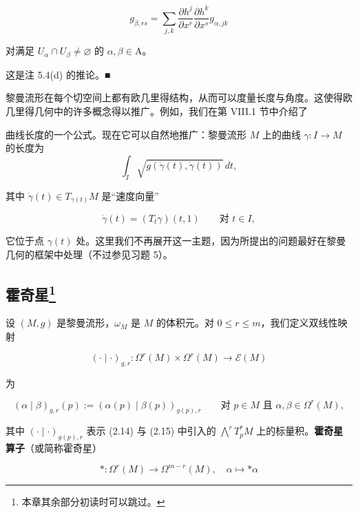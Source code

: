 \begin{example}
\[
g_{\beta,rs} = \sum_{j,k} \frac{\partial h^j}{\partial x^r} \frac{\partial h^k}{\partial x^s} g_{\alpha,jk}
\]

对满足 $ U_\alpha \cap U_\beta \ne \varnothing $ 的 $ \alpha, \beta \in \mathrm{A} $。

\proofhead
这是注 5.4(d) 的推论。\nobreak\hspace{0.35em}■

黎曼流形在每个切空间上都有欧几里得结构，从而可以度量长度与角度。这使得欧几里得几何中的许多概念得以推广。例如，我们在第 VIII.1 节中介绍了

曲线长度的一个公式。现在它可以自然地推广：黎曼流形 $ M $ 上的曲线 $ \gamma: I \to M $ 的长度为
\[
\int_{I} \sqrt{g(\dot\gamma(t), \dot\gamma(t))}\, dt ,
\]

其中 $ \dot\gamma(t) \in T_{\gamma(t)}M $ 是“速度向量”

\[
\dot\gamma(t) = (T_{t}\gamma)(t,1) \qquad \text{对 } t \in I ,
\]

它位于点 $ \gamma(t) $ 处。这里我们不再展开这一主题，因为所提出的问题最好在黎曼几何的框架中处理（不过参见习题 5）。

\end{example}

\subsection*{霍奇星\footnote{本章其余部分初读时可以跳过。}}

设 $ (M,g) $ 是黎曼流形，$ \omega_{M} $ 是 $ M $ 的体积元。对 $ 0 \le r \le m $，我们定义双线性映射

\begin{equation}
(\cdot \mid \cdot)_{g,r}: \Omega^{r}(M) \times \Omega^{r}(M) \to \mathcal{E}(M)\tag{5.16}
\end{equation}

为

\begin{equation}
(\alpha \mid \beta)_{g,r}(p) := (\alpha(p) \mid \beta(p))_{g(p),r} \qquad \text{对 } p \in M \text{ 且 } \alpha, \beta \in \Omega^{r}(M) ,\tag{5.17}
\end{equation}

其中 $ (\cdot \mid \cdot)_{g(p),r} $ 表示 (2.14) 与 (2.15) 中引入的 $ \bigwedge^{r}T_{p}^{*}M $ 上的标量积。\textbf{霍奇星算子}（或简称霍奇星）

\begin{equation}
\ast: \Omega^{r}(M) \to \Omega^{m-r}(M) , \quad \alpha \mapsto \ast\alpha\tag{5.18}
\end{equation}

